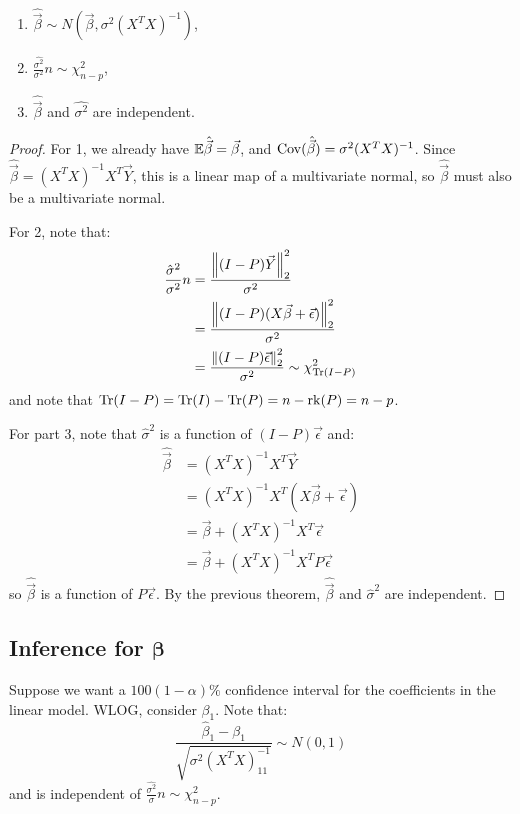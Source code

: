 \documentclass[../Main.tex]{subfiles}
\begin{document}
\begin{corollary}
    \begin{enumerate}
        \item $\hat{\vec{\beta}} \sim N(\vec{\beta}, \sigma^2(X^TX)^{-1})$,
        \item $\frac{\hat{\sigma^2}}{\sigma^2} n \sim \chi_{n-p}^2$,
        \item $\hat{\vec{\beta}}$ and $\hat{\sigma^2}$ are independent.
    \end{enumerate}
    \label{corMLEDists}
\end{corollary}
\begin{proof}
    For 1, we already have $\mathbb{E}{\hat{\vec{\beta}}} = \vec{\beta}$, and $\operatorname{Cov}(\hat{\vec{\beta}}) = \sigma^2(X^TX)^{-1}$. Since $\hat{\vec{\beta}} = (X^TX)^{-1}X^T\vec{Y}$, this is a linear map of a multivariate normal, so $\hat{\vec{\beta}}$ must also be a multivariate normal.

    For 2, note that:
    \begin{align*}
        \frac{\hat{\sigma}^2}{\sigma^2}n &= \frac{\left\|(I-P)\vec{Y}\right\|_2^2}{\sigma^2} \\
        &= \frac{\left\|(I-P)(X\vec{\beta} + \vec{\epsilon})\right\|_2^2}{\sigma^2} \\
        &= \frac{\left\|(I-P)\vec{\epsilon}\right\|_2^2}{\sigma^2} \sim \chi_{\operatorname{Tr}(I - P)}^2
    \end{align*}
    and note that $\operatorname{Tr}(I - P) = \operatorname{Tr}(I) - \operatorname{Tr}(P) = n - \operatorname{rk}(P) = n - p$.

    For part 3, note that $\hat{\sigma}^2$ is a function of $(I-P)\vec{\epsilon}$ and:
    \begin{align*}
        \hat{\vec{\beta}} &= (X^TX)^{-1} X^T \vec{Y} \\
        &= (X^TX)^{-1} X^T (X\vec{\beta} + \vec{\epsilon})\\
        &= \vec{\beta} + (X^TX)^{-1} X^T \vec{\epsilon} \\
        &= \vec{\beta} + (X^TX)^{-1} X^T P \vec{\epsilon}
    \end{align*}
    so $\hat{\vec{\beta}}$ is a function of $P\vec{\epsilon}$. By the previous theorem, $\hat{\vec{\beta}}$ and $\hat{\sigma}^2$ are independent.
\end{proof}
\subsection{Inference for \texorpdfstring{$\boldsymbol{\beta}$}{beta}}
Suppose we want a $100(1-\alpha)\%$ confidence interval for the coefficients in the linear model. WLOG, consider $\beta_1$. Note that:
\begin{equation*}
    \frac{\hat{\beta}_1 - \beta_1}{\sqrt{\sigma^2(X^TX)_{11}^{-1}}} \sim N(0, 1)
\end{equation*}
and is independent of $\frac{\hat{\sigma^2}}{\sigma} n \sim \chi_{n-p}^2$.
\end{document}
